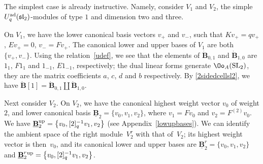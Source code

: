 \begin{exa}\label{V2V20}{\rm The simplest case is already instructive. Namely, consider $V_1$ and $V_2$, the simple $U_q^{\rm ad}({\mathfrak{sl}_2})$-modules of type $1$ and dimension two and three.

On $V_1$, we have the lower canonical basis vectors $v_+$ and $v_-$, such that $Kv_+ = qv_+$, $Ev_+=0$, $v_- = Fv_+$. The canonical lower and upper bases of $V_1$ are both $\{v_+,v_-\}$. Using the relation~\eqref{udef}, we see that the elements of $\dot{\mathbf{B}}_{0,1}$ and $\dot{\mathbf{B}}_{1,0}$ are $1_1$, $F1_1$ and $1_{-1}$, $E1_{-1}$, respectively; the dual linear forms generate $\Oo_A({\rm SL}_2)$, they are the matrix coefficients $a$, $c$, $d$ and $b$ respectively. By \eqref{2sidedcellsl2}, we have $\dot{\mathbf{B}} [1] = \dot{\mathbf{B}}_{0,1}\coprod \dot{\mathbf{B}}_{1,0}$.

Next consider $V_2$. On $V_2$, we have the canonical highest weight vector $v_0$ of weight $2$, and lower canonical basis $\underline{\mathbf{B}}_{2}=\{v_0,v_1,v_2\}$, where $v_1=Fv_0$ and $v_2=F^{(2)}v_0$. We have ${\underline{\mathbf{B}}_{2}^{\rm up}=\big\{v_0,[2]_q^{-1}v_1,v_2\big\}}$ (see Appendix~\ref{lowupbases}). We can identify the ambient space of the right module~$V_2^r$ with that of~$V_2$; its highest weight vector is then~$v_0$, and its canonical lower and upper bases are $\underline{\mathbf{B}}_{2}^r=\{v_0,v_1,v_2\}$ and $\underline{\mathbf{B}}_{2}^r{}^{\rm up}=\big\{v_0,[2]_q^{-1}v_1,v_2\big\}$.

}
\end{exa}
